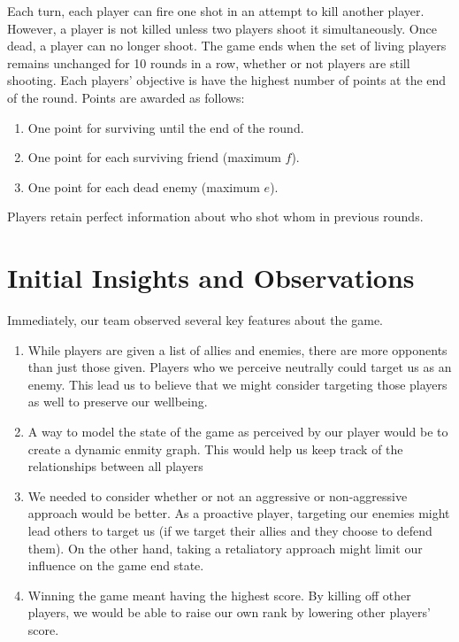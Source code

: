 \documentclass[
10pt, %
letterpaper, %
oneside, %
headinclude,footinclude, %
english
]{article}
\begin{document}
Each turn, each player can fire one shot in an attempt to kill another player. However, a player is not killed unless two players shoot it simultaneously. Once dead, a player can no longer shoot. The game ends when the set of living players remains unchanged for 10 rounds in a row, whether or not players are still shooting. Each players' objective is have the highest number of points at the end of the round. Points are awarded as follows:
\begin{enumerate}
  \item One point for surviving until the end of the round.
  \item One point for each surviving friend (maximum $f$).
  \item One point for each dead enemy (maximum $e$).
\end{enumerate}

Players retain perfect information about who shot whom in previous rounds.

\section{Initial Insights and Observations}

Immediately, our team observed several key features about the game.

\begin{enumerate}
  \item While players are given a list of allies and enemies, there are more opponents than just those given. Players who we perceive neutrally could target us as an enemy. This lead us to believe that we might consider targeting those players as well to preserve our wellbeing.
  \item A way to model the state of the game as perceived by our player would be to create a dynamic enmity graph. This would help us keep track of the relationships between all players
  \item We needed to consider whether or not an aggressive or non-aggressive approach would be better. As a proactive player, targeting our enemies might lead others to target us (if we target their allies and they choose to defend them). On the other hand, taking a retaliatory approach might limit our influence on the game end state.
  \item Winning the game meant having the highest score. By killing off other players, we would be able to raise our own rank by lowering other players' score.
\end{enumerate}
\end{document}
